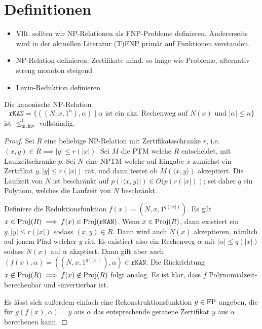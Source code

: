 \chapter{Definitionen}

\begin{itemize}
    \item Vllt. sollten wir NP-Relationen als FNP-Probleme definieren. Andererseits wird in der aktuellen Literatur (T)FNP primär auf Funktionen verstanden.
    \item NP-Relation definieren: Zertifikate mind. so lange wie Probleme, alternativ streng monoton steigend
    \item Levin-Reduktion definieren
\end{itemize}

\begin{theorem}
    Die kanonische NP-Relation
    \[ \mathtt{rKAN} = \{ ((N,x,1^n), \alpha) \mid \text{$\alpha$ ist ein akz. Rechenweg auf $N(x)$ und $|\alpha|\leq n$} \} \]
    ist $\leq_\mathrm{m,inv}^\mathrm L$-vollständig.
\end{theorem}
\begin{proof}
    Sei $R$ eine beliebige NP-Relation mit Zertifikatsschranke $r$, i.e. $(x,y)\in R\implies |y|\leq r(|x|)$. Sei $M$ die PTM welche $R$ entscheidet, mit Laufzeitschranke $p$. Sei $N$ eine NPTM welche auf Eingabe $x$ zunächst ein Zertifikat $y, |y|\leq r(|x|)$ rät, und dann testet ob $M(\langle x,y\rangle )$ akzeptiert. Die Laufzeit von $N$ ist beschränkt auf $p(|\langle x,y\rangle|)\in O(p(r(|x|))$; sei daher $q$ ein Polynom, welches die Laufzeit von $N$ beschränkt.

    Definiere die Reduktionsfunktion $f(x)=(N, x, 1^{q(|x|)})$. Es gilt $x\in \operatorname{Proj}(R)\implies f(x)\in \operatorname{Proj}(\mathtt{rKAN})$.
    Wenn $x\in\operatorname{Proj}(R)$, dann existiert ein $y, |y|\leq r(|x|)$ sodass $(x,y)\in R$. Dann wird auch $N(x)$ akzeptieren, nämlich auf jenem Pfad welcher $y$ rät. Es existiert also ein Rechenweg $\alpha$ mit $|\alpha|\leq q(|x|)$ sodass $N(x)$ auf $\alpha$ akzptiert. Dann gilt aber auch $(f(x), \alpha)=((N,x,1^{q(|x|)}),\alpha)\in \mathtt{rKAN}$.
    Die Rückrichtung $x\not\in \operatorname{Proj}(R)\implies f(x)\not\in\operatorname{Proj}(R)$ folgt analog.
    Es ist klar, dass $f$ Polynomialzeit-berechenbar und -invertierbar ist. 

    Es lässt sich außerdem einfach eine Rekonstruktionsfunktion $g\in \mathrm{FP}$ angeben, die für $g(f(x), \alpha)=y$ aus $\alpha$ das entsprechende geratene Zertifikat $y$ aus $\alpha$ berechenen kann.
\end{proof}

